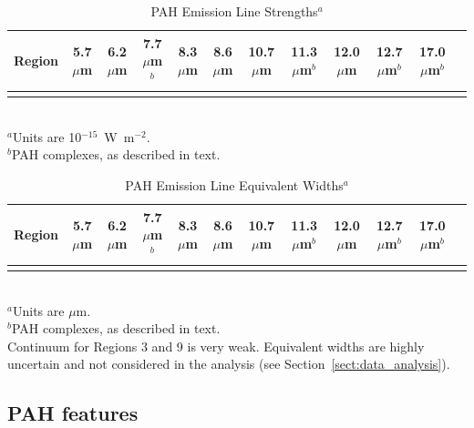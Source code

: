 \begin{table}
 \centering
 \begin{minipage}{200mm}
\caption{PAH Emission Line Strengths$^a$}
{\scriptsize
  \begin{tabular}{l c c  c  c  c  c  c  c  c  c c }
\hline
    {Region }&{5.7 $\mu$m  }&{6.2 $\mu$m  }&{7.7 $\mu$m$^b$  }&{8.3 $\mu$m  }&{8.6 $\mu$m  }&{10.7 $\mu$m  }&{11.3 $\mu$m$^b$  }&{12.0 $\mu$m  }&{12.7 $\mu$m$^b$  }&{17.0 $\mu$m$^b$  } \\
 \hline
  
 \hline
 \label{PAHlinetable}
\end{tabular}\\
{$^a$Units are 10$^{-15}$~W~m$^{-2}$.\\
$^b$PAH complexes, as described in text.}
}
\end{minipage}
\end{table}



\begin{table}
 \centering
 \begin{minipage}{200mm}
 
\caption{PAH Emission Line Equivalent Widths$^a$}
 {\scriptsize
  \begin{tabular}{l c c  c  c  c  c  c  c  c  c c }
  \hline 
     {Region }&{5.7 $\mu$m  }&{6.2 $\mu$m  }&{7.7 $\mu$m$^b$  }&{8.3 $\mu$m  }&{8.6 $\mu$m  }&{10.7 $\mu$m  }&{11.3 $\mu$m$^b$  }&{12.0 $\mu$m  }&{12.7 $\mu$m$^b$  }&{17.0 $\mu$m$^b$  } \\
 \hline
 
 \hline
 \label{EQW}
\end{tabular}\\
{$^a$Units are $\mu$m.\\
$^b$PAH complexes, as described in text.\\
Continuum for Regions 3 and 9 is very weak.  Equivalent widths are highly uncertain and not considered in the analysis (see Section~\ref{sect:data_analysis}).}
}
\end{minipage}
\end{table}



\subsection{PAH features}
\label{sect:pah}

